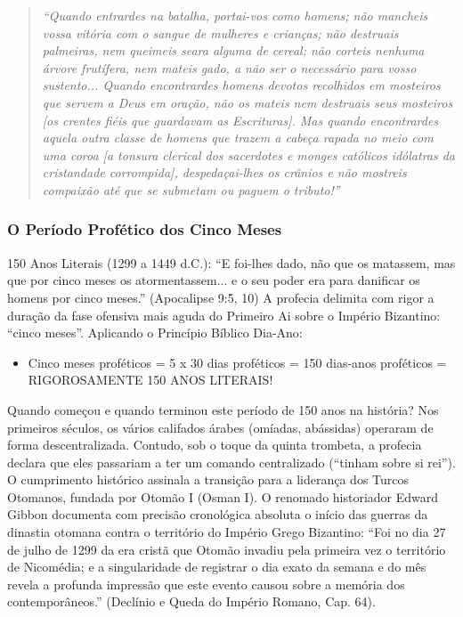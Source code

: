 \documentclass[11pt,a4paper,openany]{book}
\begin{document}
\begin{quote}
\itshape ``Quando entrardes na batalha, portai-vos como homens; não mancheis vossa vitória com o sangue de mulheres e crianças; não destruais palmeiras, nem queimeis seara alguma de cereal; não corteis nenhuma árvore frutífera, nem mateis gado, a não ser o necessário para vosso sustento... Quando encontrardes homens devotos recolhidos em mosteiros que servem a Deus em oração, não os mateis nem destruais seus mosteiros [os crentes fiéis que guardavam as Escrituras]. Mas quando encontrardes aquela outra classe de homens que trazem a cabeça rapada no meio com uma coroa [a tonsura clerical dos sacerdotes e monges católicos idólatras da cristandade corrompida], despedaçai-lhes os crânios e não mostreis compaixão até que se submetam ou paguem o tributo!''
\end{quote}



\subsubsection*{O Período Profético dos Cinco Meses}
150 Anos Literais (1299 a 1449 d.C.):
``E foi-lhes dado, não que os matassem, mas que por cinco meses os atormentassem... e o seu poder era para danificar os homens por cinco meses.'' (Apocalipse 9:5, 10)
A profecia delimita com rigor a duração da fase ofensiva mais aguda do Primeiro Ai sobre o Império Bizantino: ``cinco meses''.
Aplicando o Princípio Bíblico Dia-Ano:
\begin{itemize}
  \item Cinco meses proféticos = 5 x 30 dias proféticos = 150 dias-anos proféticos = RIGOROSAMENTE 150 ANOS LITERAIS!
\end{itemize}


Quando começou e quando terminou este período de 150 anos na história?
Nos primeiros séculos, os vários califados árabes (omíadas, abássidas) operaram de forma descentralizada. Contudo, sob o toque da quinta trombeta, a profecia declara que eles passariam a ter um comando centralizado (``tinham sobre si rei'').
O cumprimento histórico assinala a transição para a liderança dos Turcos Otomanos, fundada por Otomão I (Osman I).
O renomado historiador Edward Gibbon documenta com precisão cronológica absoluta o início das guerras da dinastia otomana contra o território do Império Grego Bizantino:
``Foi no dia 27 de julho de 1299 da era cristã que Otomão invadiu pela primeira vez o território de Nicomédia; e a singularidade de registrar o dia exato da semana e do mês revela a profunda impressão que este evento causou sobre a memória dos contemporâneos.'' (Declínio e Queda do Império Romano, Cap. 64).
\end{document}
